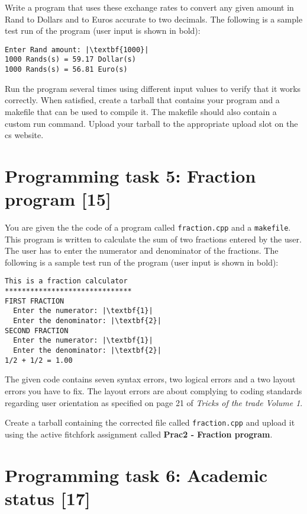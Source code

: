 \documentclass [a4paper,leqno, 12pt] {article}
\begin{document}
Write a program that uses these exchange rates to convert any given amount in Rand to Dollars and to Euros accurate to two decimals. The following is a sample test run of the  program (user input is shown in bold):   
\begin{lstlisting}
Enter Rand amount: |\textbf{1000}|
1000 Rands(s) = 59.17 Dollar(s)
1000 Rands(s) = 56.81 Euro(s)
\end{lstlisting}

Run the program several times using different input values to verify that it works correctly. When satisfied, create a tarball that contains your program and a makefile that can be used to compile it. The makefile should also contain a custom run command. Upload your tarball to the appropriate upload slot on the cs website.

\section{Programming task 5: Fraction program [15]}

You are given the the code of a program called \texttt{fraction.cpp} and a \texttt{makefile}. This program is written to calculate the sum of two fractions entered by the user. The user has to enter the numerator and denominator of the fractions.
The following is a sample test run of the  program (user input is shown in bold):   
\begin{lstlisting}
This is a fraction calculator
******************************
FIRST FRACTION
  Enter the numerator: |\textbf{1}|  
  Enter the denominator: |\textbf{2}|
SECOND FRACTION 
  Enter the numerator: |\textbf{1}|
  Enter the denominator: |\textbf{2}|
1/2 + 1/2 = 1.00
\end{lstlisting}

The given code contains seven syntax errors, two logical errors and a two layout errors you have to fix. The layout errors are about complying to coding standards regarding user orientation as specified on page 21 of \textit{Tricks of the trade Volume 1}. 

Create a tarball containing the corrected file called \texttt{fraction.cpp} and upload it using the active fitchfork assignment called \textbf{Prac2 - Fraction program}.

\newpage
\section{Programming task 6: Academic status [17]}
\end{document}
